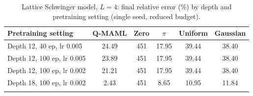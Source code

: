 \begin{table}[!htb]
\centering
\caption{Lattice Schwinger model, $L{=}4$: final relative error (\%) by depth and pretraining setting (single seed, reduced budget).}\label{tab:supp_l4}
\begin{tabular}{@{}lccccc@{}}
\toprule
Pretraining setting & Q-MAML & Zero & $\pi$ & Uniform & Gaussian \\
\midrule
Depth 12, 40 ep, lr 0.005 & 24.49 & 451 & 17.95 & 39.44 & 38.40 \\
Depth 12, 100 ep, lr 0.005 & 23.89 & 451 & 17.95 & 39.44 & 38.40 \\
Depth 12, 100 ep, lr 0.002 & 21.21 & 451 & 17.95 & 39.44 & 38.40 \\
Depth 18, 100 ep, lr 0.002 & 2.43 & 451 & 8.65 & 10.95 & 11.84 \\
\botrule
\end{tabular}
\end{table}
